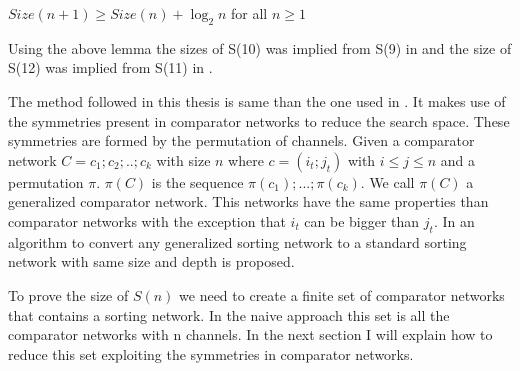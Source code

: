 \documentclass[../main.tex]{subfiles}
\begin{document}
	\begin{lemma}
		$Size(n+1) \geq Size(n) + \log_2 n$ for all $n \geq 1$
	\end{lemma}

	Using the above lemma the sizes of S(10) was implied from S(9) in \cite{sortingnineinputs} and the size of S(12) was implied from S(11) in \cite{harder2021answer}.
	
	The method followed in this thesis is same than the one used in \cite{sortingnineinputs}. It makes use of the symmetries present in comparator networks to reduce the search space. These symmetries are formed by the permutation of channels. Given a comparator network $C=c_1;c_2;..;c_k$ with size $n$ where $c=(i_t;j_t)$ with $i\leq j \leq n$ and a permutation $\pi$. $\pi(C)$ is the sequence $\pi(c_1);...;\pi(c_k)$. We call $\pi(C)$ a generalized comparator network. This networks have the same properties than comparator networks with the exception that $i_t$ can be bigger than $j_t$. In \cite{knuth1997art} an algorithm to convert any generalized sorting network to a standard sorting network with same size and depth is proposed. 
	
	To prove the size of $S(n)$ we need to create a finite set of comparator networks that contains a sorting network. In the naive approach this set is all the comparator networks with n channels. In the next section I will explain how to reduce this set exploiting the symmetries in comparator networks. 
	
	
	
\end{document}
